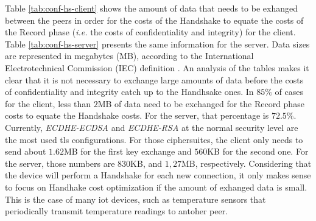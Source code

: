 Table \ref{tab:conf-hs-client} shows the amount of data that needs to be exhanged between the peers in order for the costs of the Handshake to equate
the costs of the Record phase (\textit{i.e.} the costs of confidentiality and integrity) for the client. Table \ref{tab:conf-hs-server} presents the
same information for the server. Data sizes are represented in megabytes (MB), according to the International Electrotechnical Commission (IEC)
definition \cite{Definiti62:online}. An analysis of the tables makes it clear that it is not necessary to exchange large amounts of data
before the costs of confidentiality and integrity catch up to the Handhsake ones. In $85\%$ of cases for the client, less than $2$MB of data need to be exchanged for the Record phase costs to equate 
the Handshake costs. For the server, that percentage
is $72.5\%$. Currently, \textit{ECDHE-ECDSA} and \textit{ECDHE-RSA} at the normal security level are the most used \gls{tls} configurations\cite{QualysSS90:online}. 
For those ciphersuites, the client only needs to send about $1.62$MB for the first key exchange and $560$KB for the second one. For the server, those numbers are 
$830$KB, and $1,27$MB, respectively.
Considering that the device will perform a Handshake for each new connection, it only makes sense to focus on Handhake cost optimization if the amount of exhanged data is small. This is the case of many
\gls{iot} devices, such as temperature sensors that periodically transmit temperature readings to antoher peer. 


